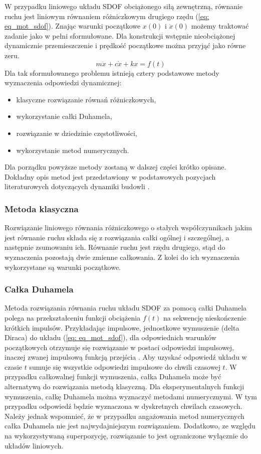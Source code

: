W przypadku liniowego układu SDOF obciążonego siłą zewnętrzną, równanie ruchu jest liniowym równaniem różniczkowym drugiego rzędu (\ref{eq: eq_mot_sdof}). Znając warunki początkowe $x(0)$ i $\dot{x}(0)$ możemy traktować zadanie jako w pełni sformułowane. Dla konstrukcji wstępnie nieobciążonej dynamicznie przemieszczenie i prędkość początkowe można przyjąć jako równe zeru.
\begin{equation} \label{eq: eq_mot_sdof}
	m\ddot{x}+c\dot{x}+k{x}=f(t)
\end{equation}
Dla tak sformułowanego problemu istnieją cztery podstawowe metody wyznaczenia odpowiedzi dynamicznej:
\begin{itemize}[noitemsep]
	\item klasyczne rozwiązanie równań różniczkowych,
	\item wykorzystanie całki Duhamela,
	\item rozwiązanie w dziedzinie częstotliwości,
	\item wykorzystanie metod numerycznych.
\end{itemize}
Dla porządku powyższe metody zostaną w dalszej części krótko opisane. Dokładny opis metod jest przedstawiony w podstawowych pozycjach literaturowych dotyczących dynamiki budowli \parencite{Chmielewski1998,Chopra2012a,Clough1975,Bajer2012}. 

\subsubsection{Metoda klasyczna}

Rozwiązanie liniowego równania różniczkowego o stałych współczynnikach jakim jest równanie ruchu składa się z rozwiązania całki ogólnej i szczególnej, a następnie zsumowaniu ich. Równanie ruchu jest rzędu drugiego, stąd do wyznaczenia pozostają dwie zmienne całkowania. Z kolei do ich wyznaczenia wykorzystane są warunki początkowe.

\subsubsection{Całka Duhamela}

Metoda rozwiązania równania ruchu układu SDOF za pomocą całki Duhamela polega na przekształceniu funkcji obciążenia $f(t)$ na sekwencję nieskończenie krótkich impulsów. Przykładając impulsowe, jednostkowe wymuszenie (delta Diraca) do układu (\ref{eq: eq_mot_sdof}), dla odpowiednich warunków początkowych otrzymuje się rozwiązanie w postaci odpowiedzi impulsowej, inaczej zwanej impulsową funkcją przejścia . Aby uzyskać odpowiedź układu w czasie $t$ sumuje się wszystkie odpowiedzi impulsowe do chwili czasowej $t$. W przypadku całkowalnej funkcji wymuszenia, całka Duhamela może być alternatywą do rozwiązania metodą klasyczną. Dla eksperymentalnych funkcji wymuszenia, całkę Duhamela można wyznaczyć metodami numerycznymi. W tym przypadku odpowiedź będzie wyznaczona w dyskretnych chwilach czasowych. Należy jednak wspomnieć, że w przypadku angażowania metod numerycznych całka Duhamela nie jest najwydajniejszym rozwiązaniem. Dodatkowo, ze względu na wykorzystywaną superpozycję, rozwiązanie to jest ograniczone wyłącznie do układów liniowych.


